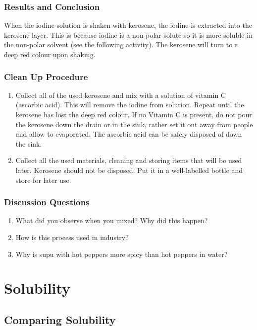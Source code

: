 \subsubsection*{Results and Conclusion}
When the iodine solution is shaken with kerosene, the iodine is extracted into the kerosene layer. This is because iodine is a non-polar solute so it is more soluble in the non-polar solvent (see the following activity). The kerosene will turn to a deep red colour upon shaking. 

\subsubsection*{Clean Up Procedure}
\begin{enumerate}
\item{Collect all of the used kerosene and mix with a solution of vitamin C (ascorbic acid). This will remove the iodine from solution. Repeat until the kerosene has lost the deep red colour. If no Vitamin C is present, do not pour the kerosene down the drain or in the sink, rather set it out away from people and allow to evaporated. The ascorbic acid can be safely disposed of down the sink.}
\item{Collect all the used materials, cleaning and storing items that will be used later. Kerosene should not be disposed. Put it in a well-labelled bottle and store for later use.}
\end{enumerate}

\subsubsection*{Discussion Questions}
\begin{enumerate}
\item{What did you observe when you mixed? Why did this happen?}
\item{How is this process used in industry?}
\item{Why is supu with hot peppers more spicy than hot peppers in water?}
\end{enumerate}




\section{Solubility}

\subsection{Comparing Solubility}

